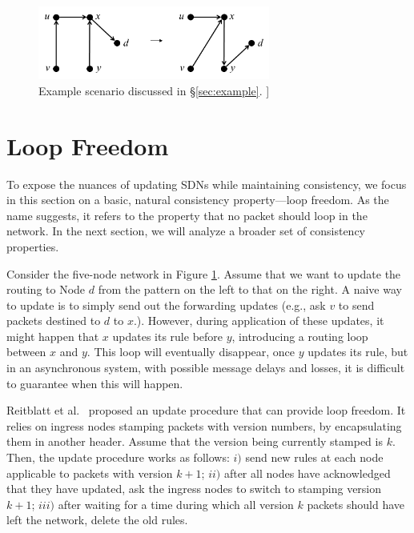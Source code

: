 
\begin{figure}[t!]
\includegraphics[width=3in]{figures/noloops.png}
\caption{Example scenario discussed in \S\ref{sec:example}. ]
}
\label{fig:example}
\end{figure}

\section{Loop Freedom}
\label{sec:loop-free}

To expose the nuances of updating SDNs while maintaining consistency, we focus in this section on a basic, natural consistency property---loop freedom. As the name suggests, it refers to the property that no packet should loop in the network.  In the next section, we will analyze a broader set of consistency properties.

Consider the five-node network in Figure \ref{fig:example}. Assume that we want to update the routing to Node $d$ from the pattern on the left to that on the right. A naive way to update is to simply send out the forwarding updates (e.g., ask $v$ to send packets destined to $d$ to $x$.). However, during application of these updates, it might happen that $x$ updates its rule before $y$, introducing a routing loop between $x$ and $y$. This loop will eventually disappear, once $y$ updates its rule, but in an asynchronous system, with possible message delays and losses, it is difficult to guarantee when this will happen.

Reitblatt et al.~\cite{safeupdates} proposed an update procedure that can provide loop freedom. It  relies on ingress nodes stamping packets with version numbers, by encapsulating them in another header. Assume that the version being currently stamped is $k.$ Then, the update procedure works as follows: $i)$ send new rules at each node applicable to packets with version $k+1$; $ii)$ after all nodes have acknowledged that they have updated, ask the ingress nodes to switch to stamping version $k+1$; $iii)$ after waiting for a time during which all version $k$ packets should have left the network, delete the old rules.



